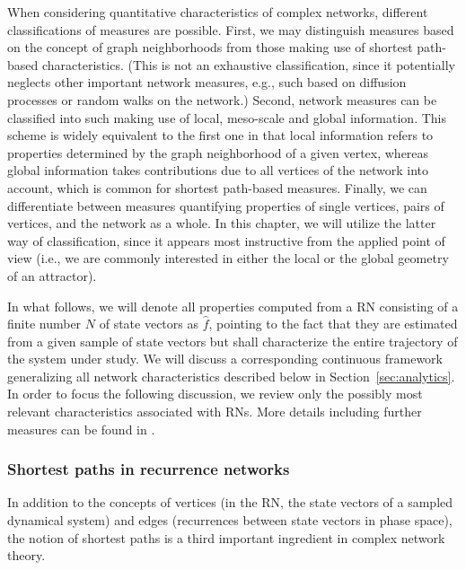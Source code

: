 When considering quantitative characteristics of complex networks, different classifications of measures are possible. First, we may distinguish measures based on the concept of graph neighborhoods from those making use of shortest path-based characteristics. (This is not an exhaustive classification, since it potentially neglects other important network measures, e.g., such based on diffusion processes or random walks on the network.) Second, network measures can be classified into such making use of local, meso-scale and global information. This scheme is widely equivalent to the first one in that local information refers to properties determined by the graph neighborhood of a given vertex, whereas global information takes contributions due to all vertices of the network into account, which is common for shortest path-based measures. Finally, we can differentiate between measures quantifying properties of single vertices, pairs of vertices, and the network as a whole. In this chapter, we will utilize the latter way of classification, since it appears most instructive from the applied point of view (i.e., we are commonly interested in either the local or the global geometry of an attractor).

In what follows, we will denote all properties computed from a RN consisting of a finite number $N$ of state vectors as $\hat{f}$, pointing to the fact that they are estimated from a given sample of state vectors but shall characterize the entire trajectory of the system under study. We will discuss a corresponding continuous framework generalizing all network characteristics described below in Section~\ref{sec:analytics}. In order to focus the following discussion, we review only the possibly most relevant characteristics associated with RNs. More details including further measures can be found in \cite{Donges2012PRE,Donner2010NJP}.


\subsubsection{Shortest paths in recurrence networks}

In addition to the concepts of vertices (in the RN, the state vectors of a sampled dynamical system) and edges (recurrences between state vectors in phase space), the notion of shortest paths is a third important ingredient in complex network theory. 

